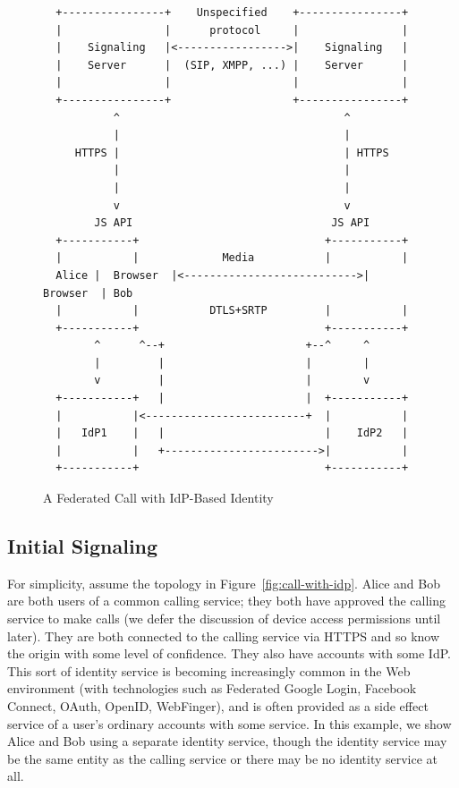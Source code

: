 \documentclass{article}
\begin{document}
\begin{figure}[ht]
\begin{verbatim}
  +----------------+    Unspecified    +----------------+
  |                |      protocol     |                |
  |    Signaling   |<----------------->|    Signaling   |
  |    Server      |  (SIP, XMPP, ...) |    Server      |
  |                |                   |                |
  +----------------+                   +----------------+
           ^                                   ^
           |                                   |
     HTTPS |                                   | HTTPS
           |                                   |
           |                                   |
           v                                   v
        JS API                               JS API
  +-----------+                             +-----------+
  |           |             Media           |           |
  Alice |  Browser  |<--------------------------->|  Browser  | Bob
  |           |           DTLS+SRTP         |           |
  +-----------+                             +-----------+
        ^      ^--+                      +--^     ^
        |         |                      |        |
        v         |                      |        v
  +-----------+   |                      |  +-----------+
  |           |<-------------------------+  |           |
  |   IdP1    |   |                         |    IdP2   |
  |           |   +------------------------>|           |
  +-----------+                             +-----------+
\end{verbatim}
\caption{A Federated Call with IdP-Based Identity}
\label{fig:federated-call-with-idp}
\end{figure}

\subsection{Initial Signaling}

For simplicity, assume the topology in Figure~\ref{fig:call-with-idp}.  Alice and Bob are
both users of a common calling service; they both have approved the
calling service to make calls (we defer the discussion of device
access permissions until later).  They are both connected to the
calling service via HTTPS and so know the origin with some level of
confidence.  They also have accounts with some IdP.  This sort of
identity service is becoming increasingly common in the Web
environment (with technologies such as Federated Google Login,
Facebook Connect, OAuth, OpenID, WebFinger), and is often provided as
a side effect service of a user's ordinary accounts with some
service.  In this example, we show Alice and Bob using a separate
identity service, though the identity service may be the same entity
as the calling service or there may be no identity service at all.
\end{document}
